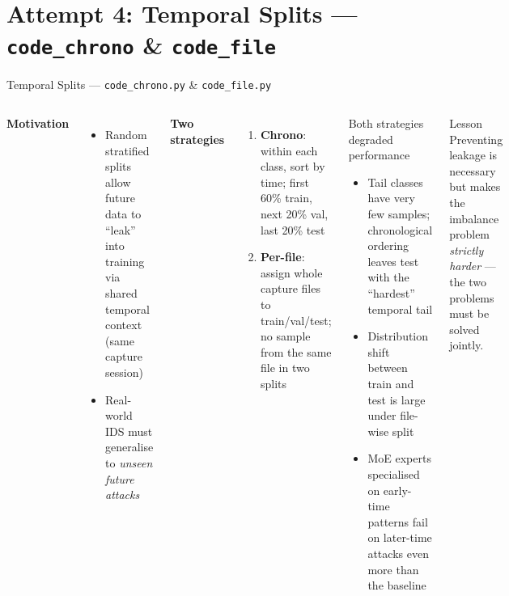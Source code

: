 \documentclass[aspectratio=169,10pt]{beamer}
\begin{document}
\section{Attempt 4: Temporal Splits --- \texttt{code\_chrono} \& \texttt{code\_file}}

\begin{frame}{Temporal Splits --- \texttt{code\_chrono.py} \& \texttt{code\_file.py}}
  \begin{columns}[T]
      \textbf{Motivation}
      \begin{itemize}
        \item Random stratified splits allow future data to ``leak'' into
              training via shared temporal context (same capture session)
        \item Real-world IDS must generalise to \emph{unseen future attacks}
      \end{itemize}
      \vspace{6pt}
      \textbf{Two strategies}
      \begin{enumerate}
        \item \textbf{Chrono}: within each class, sort by time;
              first 60\% train, next 20\% val, last 20\% test
        \item \textbf{Per-file}: assign whole capture files to
              train/val/test; no sample from the same file in two splits
      \end{enumerate}
      \begin{alertblock}{Both strategies degraded performance}
        \begin{itemize}
          \item Tail classes have very few samples; chronological
                ordering leaves test with the ``hardest'' temporal tail
          \item Distribution shift between train and test is large
                under file-wise split
          \item MoE experts specialised on early-time patterns fail
                on later-time attacks even more than the baseline
        \end{itemize}
      \end{alertblock}
      \vspace{4pt}
      \begin{block}{Lesson}
        Preventing leakage is necessary but makes the imbalance problem
        \emph{strictly harder} --- the two problems must be solved jointly.
      \end{block}
  \end{columns}
\end{frame}
\end{document}

